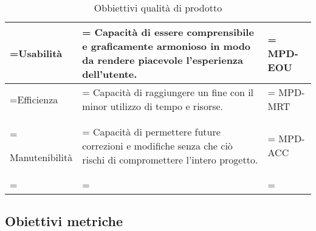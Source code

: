 \begin{xltabular}{\textwidth} {
        >{\hsize\linewidth=\hsize}X
        >{\hsize\linewidth=\hsize}X
        >{\hsize\linewidth=\hsize}X
    }
    Usabilità &
    Capacità di essere comprensibile e graficamente
    armonioso in modo da rendere piacevole l'esperienza
    dell'utente. &
    MPD-EOU
    \\ \hline

    Efficienza &
    Capacità di raggiungere un fine con il minor utilizzo di
    tempo e risorse. &
    MPD-MRT
    \\ \hline

    Manutenibilità &
    Capacità di permettere future correzioni e modifiche
    senza che ciò rischi di compromettere l'intero progetto. &
    MPD-ACC
    \\ \hline

    \caption{Obbiettivi qualità di prodotto}
\end{xltabular}



\subsection{Obiettivi metriche}

